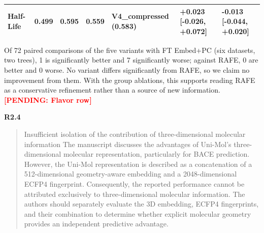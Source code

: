 \documentclass[
  10pt,
]{article}
\newcommand{\placeholder}[1]{\textcolor{red}{\textbf{[PENDING#1]}}}
\begin{document}
\begin{longtable}[]{@{}lllllll@{}}
\begin{minipage}[t]{0.12\columnwidth}\raggedright
Half-Life\strut
\end{minipage} & \begin{minipage}[t]{0.12\columnwidth}\raggedright
0.499\strut
\end{minipage} & \begin{minipage}[t]{0.12\columnwidth}\raggedright
0.595\strut
\end{minipage} & \begin{minipage}[t]{0.12\columnwidth}\raggedright
0.559\strut
\end{minipage} & \begin{minipage}[t]{0.12\columnwidth}\raggedright
V4\_compressed (0.583)\strut
\end{minipage} & \begin{minipage}[t]{0.12\columnwidth}\raggedright
+0.023 {[}-0.026, +0.072{]}\strut
\end{minipage} & \begin{minipage}[t]{0.12\columnwidth}\raggedright
-0.013 {[}-0.044, +0.020{]}\strut
\end{minipage}\tabularnewline
\bottomrule
\end{longtable}

Of 72 paired comparisons of the five variants with FT Embed+PC (six
datasets, two trees), 1 is significantly better and 7 significantly
worse; against RAFE, 0 are better and 0 worse. No variant differs
significantly from RAFE, so we claim no improvement from them. With the
group ablations, this supports reading RAFE as a conservative refinement
rather than a source of new information. \placeholder{: Flavor
row}

\textbf{R2.4}

\begin{quote}
Insufficient isolation of the contribution of three-dimensional
molecular information The manuscript discusses the advantages of
Uni-Mol's three-dimensional molecular representation, particularly for
BACE prediction. However, the Uni-Mol representation is described as a
concatenation of a 512-dimensional geometry-aware embedding and a
2048-dimensional ECFP4 fingerprint. Consequently, the reported
performance cannot be attributed exclusively to three-dimensional
molecular information. The authors should separately evaluate the 3D
embedding, ECFP4 fingerprints, and their combination to determine
whether explicit molecular geometry provides an independent predictive
advantage.
\end{quote}
\end{document}
